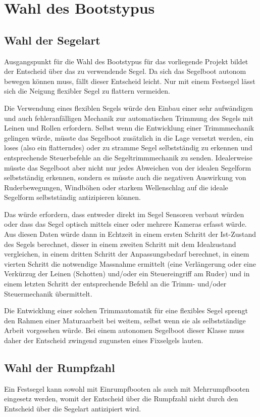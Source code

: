 \section{Wahl des Bootstypus}
\subsection{Wahl der Segelart}
Ausgangspunkt für die Wahl des Bootstypus für das vorliegende Projekt bildet der Entscheid über das zu verwendende Segel. Da sich das Segelboot autonom bewegen können muss, fällt dieser Entscheid leicht. Nur mit einem Festsegel lässt sich die Neigung flexibler Segel zu flattern vermeiden. 

Die Verwendung eines flexiblen Segels würde den Einbau einer sehr aufwändigen und auch fehleranfälligen Mechanik zur automatischen Trimmung des Segels mit Leinen und Rollen erfordern. Selbst wenn die Entwicklung einer Trimmmechanik gelingen würde, müsste das Segelboot zusätzlich in die Lage versetzt werden, ein loses (also ein flatterndes) oder zu stramme Segel selbstständig zu erkennen und entsprechende Steuerbefehle an die Segeltrimmmechanik zu senden. Idealerweise müsste das Segelboot aber nicht nur jedes Abweichen von der idealen Segelform selbstständig erkennen, sondern es müsste auch die negativen Auswirkung von Ruderbewegungen, Windböhen oder starkem Wellenschlag auf die ideale Segelform selbstständig antizipieren können. 

Das würde erfordern, dass entweder direkt im Segel Sensoren verbaut würden oder dass das Segel optisch mittels einer oder mehrere Kameras erfasst würde. Aus diesen Daten würde dann in Echtzeit in einem ersten Schritt der Ist-Zustand des Segels berechnet, dieser in einem zweiten Schritt mit dem Idealzustand vergleichen, in einem dritten Schritt der Anpassungsbedarf berechnet, in einem vierten Schritt die notwendige Massnahme ermittelt (eine Verlängerung oder eine Verkürzug der Leinen (Schotten) und/oder ein Steuereingriff am Ruder) und in einem letzten Schritt der entsprechende Befehl an die Trimm- und/oder Steuermechanik übermittelt. 

Die Entwicklung einer solchen Trimmautomatik für eine flexibles Segel sprengt den Rahmen einer Maturaarbeit bei weitem, selbst wenn sie als selbstständige Arbeit vorgesehen würde. Bei einem autonomen Segelboot dieser Klasse muss daher der Entscheid zwingend zugunsten eines Fixselgels lauten.
\subsection{Wahl der Rumpfzahl}
Ein Festsegel kann sowohl mit Einrumpfbooten als auch mit Mehrrumpfbooten eingesetz werden, womit der Entscheid über die Rumpfzahl nicht durch den Entscheid über die Segelart antizipiert wird.  

